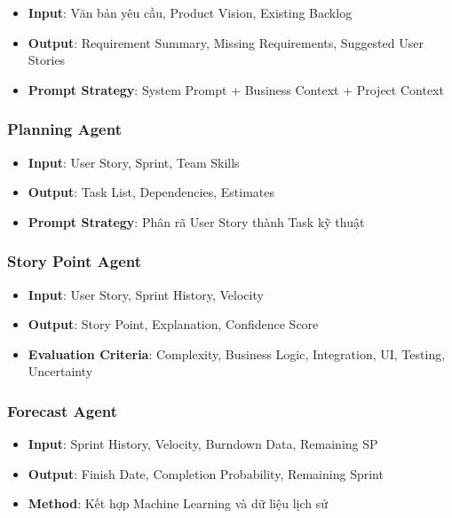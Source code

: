 \documentclass[12pt,a4paper]{report}
\begin{document}
\begin{itemize}
\item \textbf{Input}: Văn bản yêu cầu, Product Vision, Existing Backlog
\item \textbf{Output}: Requirement Summary, Missing Requirements, Suggested User Stories
\item \textbf{Prompt Strategy}: System Prompt + Business Context + Project Context
\end{itemize}

\subsubsection{Planning Agent}

\begin{itemize}
\item \textbf{Input}: User Story, Sprint, Team Skills
\item \textbf{Output}: Task List, Dependencies, Estimates
\item \textbf{Prompt Strategy}: Phân rã User Story thành Task kỹ thuật
\end{itemize}

\subsubsection{Story Point Agent}

\begin{itemize}
\item \textbf{Input}: User Story, Sprint History, Velocity
\item \textbf{Output}: Story Point, Explanation, Confidence Score
\item \textbf{Evaluation Criteria}: Complexity, Business Logic, Integration, UI, Testing, Uncertainty
\end{itemize}

\subsubsection{Forecast Agent}

\begin{itemize}
\item \textbf{Input}: Sprint History, Velocity, Burndown Data, Remaining SP
\item \textbf{Output}: Finish Date, Completion Probability, Remaining Sprint
\item \textbf{Method}: Kết hợp Machine Learning và dữ liệu lịch sử
\end{itemize}
\end{document}
